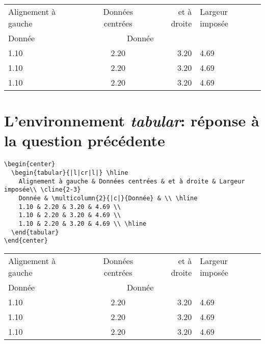 \begin{center}
  \begin{tabular}{|l|cr|l|} \hline
    Alignement à gauche & Données centrées & et à droite & Largeur imposée\\ \cline{2-3}
    Donnée & \multicolumn{2}{|c|}{Donnée} & \\ \hline
    1.10 & 2.20 & 3.20 & 4.69 \\
    1.10 & 2.20 & 3.20 & 4.69 \\
    1.10 & 2.20 & 3.20 & 4.69 \\ \hline
  \end{tabular}
\end{center}


\section{L'environnement \emph{tabular}: réponse à la question
  précédente}

\begin{boxedminipage}{\textwidth}
\footnotesize
\begin{verbatim}
\begin{center}
  \begin{tabular}{|l|cr|l|} \hline
    Alignement à gauche & Données centrées & et à droite & Largeur imposée\\ \cline{2-3}
    Donnée & \multicolumn{2}{|c|}{Donnée} & \\ \hline
    1.10 & 2.20 & 3.20 & 4.69 \\
    1.10 & 2.20 & 3.20 & 4.69 \\
    1.10 & 2.20 & 3.20 & 4.69 \\ \hline
  \end{tabular}
\end{center}
\end{verbatim}
\end{boxedminipage}

\begin{center}
  \begin{tabular}{|l|cr|l|} \hline
    Alignement à gauche & Données centrées & et à droite & Largeur imposée\\ \cline{2-3}
    Donnée & \multicolumn{2}{|c|}{Donnée} & \\ \hline
    1.10 & 2.20 & 3.20 & 4.69 \\
    1.10 & 2.20 & 3.20 & 4.69 \\
    1.10 & 2.20 & 3.20 & 4.69 \\ \hline
  \end{tabular}
\end{center}

